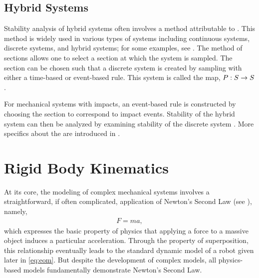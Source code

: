 \subsection{Hybrid Systems}

Stability analysis of hybrid systems often involves a method attributable to
\Poincare{}.
%
This method is widely used in various types of systems including continuous
systems, discrete systems, and hybrid systems; for some examples, see
\cite{Guckenheimer1983, Parker1989, Perko2001, Grizzle2014}.
%
The method of \Poincare{} sections allows one to select a \Poincare{} section
at which the system is sampled.
%
The \Poincare{} section can be chosen such that a discrete system is created by
sampling with either a time-based or event-based rule.
%
This system is called the \Poincare{} map, $P : S \to S$.


For mechanical systems with impacts, an event-based rule is constructed by
choosing the \Poincare{} section to correspond to impact events.
%
Stability of the hybrid system can then be analyzed by examining stability of
the discrete system \cite{Morris2009}.
%
More specifics about the \Poincare{} are introduced in
.



\section{Rigid Body Kinematics}

At its core, the modeling of complex mechanical systems involves a
straightforward, if often complicated, application of Newton's Second Law (see
\cite{Feynman1964}), namely,
\begin{align*}
  F = m a,
\end{align*}
which expresses the basic property of physics that applying a force to a massive
object induces a particular acceleration.
%
Through the property of superposition, this relationship eventually leads to the
standard dynamic model of a robot given later in \eqref{eq:eom}.
%
But despite the development of complex models, all physics-based models
fundamentally demonstrate Newton's Second Law.

